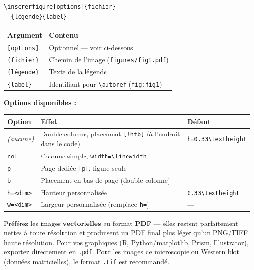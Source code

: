 \documentclass[12pt, a4paper]{article}
\begin{document}
\begin{demo}
\begin{lstlisting}[style=latexcode]
% Syntaxe générale :
\insererfigure[options]{fichier}
  {légende}{label}
\end{lstlisting}
\tcblower
\footnotesize
\begin{tabular}{@{}lp{4.8cm}@{}}
  \toprule
  \textbf{Argument} & \textbf{Contenu} \\
  \midrule
  \texttt{[options]} & Optionnel — voir ci-dessous \\
  \texttt{\{fichier\}} & Chemin de l'image (\texttt{figures/fig1.pdf}) \\
  \texttt{\{légende\}} & Texte de la légende \\
  \texttt{\{label\}} & Identifiant pour \texttt{\textbackslash autoref} (\texttt{fig:fig1}) \\
  \bottomrule
\end{tabular}
\end{demo}

\textbf{Options disponibles :}

\begin{center}
\footnotesize
\begin{tabular}{lp{7.5cm}l}
  \toprule
  \textbf{Option} & \textbf{Effet} & \textbf{Défaut} \\
  \midrule
  \textit{(aucune)} & Double colonne, placement \texttt{[!htb]} (à l'endroit dans le code) & \texttt{h=0.33\textbackslash textheight} \\
  \texttt{col}      & Colonne simple, \texttt{width=\textbackslash linewidth} & — \\
  \texttt{p}        & Page dédiée \texttt{[p]}, figure seule & — \\
  \texttt{b}        & Placement en bas de page (double colonne)  & — \\
  \texttt{h=<dim>}  & Hauteur personnalisée & \texttt{0.33\textbackslash textheight} \\
  \texttt{w=<dim>}  & Largeur personnalisée (remplace \texttt{h=}) & — \\
  \bottomrule
\end{tabular}
\end{center}

\begin{astuce}
  Préférez les images \textbf{vectorielles} au format \textbf{PDF} — elles
  restent parfaitement nettes à toute résolution et produisent un PDF final
  plus léger qu'un PNG/TIFF haute résolution. Pour vos graphiques
  (R, Python/matplotlib, Prism, Illustrator), exportez directement en
  \texttt{.pdf}. Pour les images de microscopie ou Western blot (données
  matricielles), le format \texttt{.tif} est recommandé.
\end{astuce}
\end{document}
